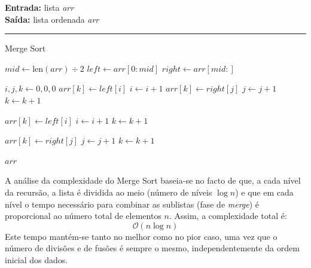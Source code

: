 \documentclass[conference]{IEEEtran}
\begin{document}
\begin{algorithm}[H]
    \raggedright
    \vspace{.1em}
    \textbf{Entrada:} lista \textit{arr} \\
    \textbf{Saída:} lista ordenada \textit{arr} \\
    \vspace{.5em}
    \hrule 
    \caption{Merge Sort}
    \begin{algorithmic}[1]
                \State $mid \gets \text{len}(arr) \div 2$
                \State $left \gets arr[0 : mid]$
                \State $right \gets arr[mid : ]$
                
                \State {}
                \State {}
    
                \State $i, j, k \gets 0, 0, 0$
                        \State $arr[k] \gets left[i]$
                        \State $i \gets i + 1$
                    \Else
                        \State $arr[k] \gets right[j]$
                        \State $j \gets j + 1$
                    \EndIf
                    \State $k \gets k + 1$
                \EndWhile
    
                    \State $arr[k] \gets left[i]$
                    \State $i \gets i + 1$
                    \State $k \gets k + 1$
                \EndWhile
    
                    \State $arr[k] \gets right[j]$
                    \State $j \gets j + 1$
                    \State $k \gets k + 1$
                \EndWhile
            \EndIf
        \EndFunction
    
        \State {}
        \State \Return $arr$
    \end{algorithmic}
\end{algorithm}

A análise da complexidade do Merge Sort baseia-se no facto de que, a cada nível da recursão, a lista é dividida ao meio (número de níveis \(\log n\)) e que em cada nível o tempo necessário para combinar as sublistas (fase de \textit{merge}) é proporcional ao número total de elementos \(n\). Assim, a complexidade total é:
\[
\mathcal{O}(n \log n)
\]
Este tempo mantém-se tanto no melhor como no pior caso, uma vez que o número de divisões e de fusões é sempre o mesmo, independentemente da ordem inicial dos dados.
\end{document}
